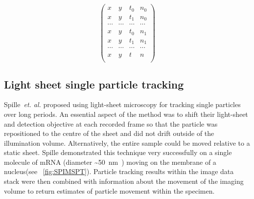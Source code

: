\begin{figure}
\begin{subfigure}[t]{0.45\linewidth}
\begin{equation}
                \begin{pmatrix}
              x & y & t_0 & n_0\\
              x & y & t_1 & n_0 \\
              \cdots & \cdots & \cdots & \cdots \\
              x & y & t_0 & n_1 \\
              x & y & t_1 & n_1 \\
              \cdots & \cdots & \cdots & \cdots \\
              x & y & t & n \\
          \end{pmatrix}\label{eq:xytn_detection}
        \end{equation}
    \end{subfigure}
\end{figure}

\subsection{Light sheet single particle tracking}

Spille~\emph{et. al.} proposed using \gls{light-sheet} microscopy for tracking single particles over long periods.
An essential aspect of the method was to shift their \gls{light-sheet}
and detection objective at each recorded frame so that the particle was repositioned to the centre of the sheet and did not drift outside of the illumination volume.
Alternatively, the entire sample could be moved relative to a static sheet.
Spille demonstrated this technique very successfully on a single molecule of mRNA (diameter \SI{~50}{\nano\metre}~\cite{Spille2015a}) moving on the membrane of a nucleus(see \figurename~\ref{fig:SPIMSPT}).
Particle tracking results within the image data stack were then combined with information about the movement of the imaging volume to return estimates of particle movement within the specimen.

